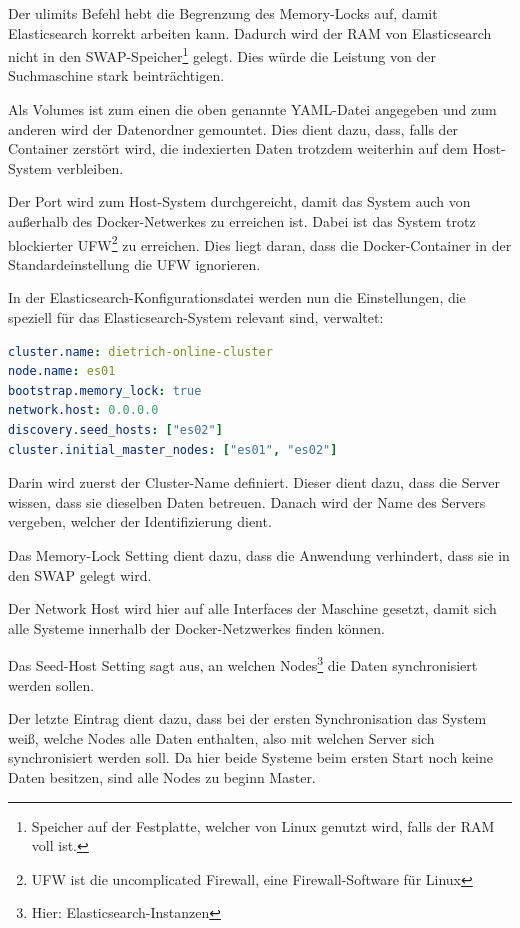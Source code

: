 Der ulimits Befehl hebt die Begrenzung des Memory-Locks auf, damit Elasticsearch korrekt arbeiten kann. Dadurch wird der RAM von Elasticsearch nicht in den SWAP-Speicher\footnote{Speicher auf der Festplatte, welcher von Linux genutzt wird, falls der RAM voll ist.} gelegt. Dies würde die Leistung von der Suchmaschine stark beinträchtigen.

Als Volumes ist zum einen die oben genannte YAML-Datei angegeben und zum anderen wird der Datenordner gemountet. Dies dient dazu, dass, falls der Container zerstört wird, die indexierten Daten trotzdem weiterhin auf dem Host-System verbleiben.

Der Port wird zum Host-System durchgereicht, damit das System auch von außerhalb des Docker-Netwerkes zu erreichen ist. Dabei ist das System trotz blockierter UFW\footnote{UFW ist die uncomplicated Firewall, eine Firewall-Software für Linux} zu erreichen. Dies liegt daran, dass die Docker-Container in der Standardeinstellung die UFW ignorieren.

In der Elasticsearch-Konfigurationsdatei werden nun die Einstellungen, die speziell für das Elasticsearch-System relevant sind, verwaltet: 

\begin{lstlisting}[language=YAML, frame=single, label={lst:es01-yml}, caption=Auschnitt aus der Konfigurationsdatei von Elasticsearch,captionpos=b] 
cluster.name: dietrich-online-cluster
node.name: es01
bootstrap.memory_lock: true
network.host: 0.0.0.0
discovery.seed_hosts: ["es02"]
cluster.initial_master_nodes: ["es01", "es02"]
\end{lstlisting}

Darin wird zuerst der Cluster-Name definiert. Dieser dient dazu, dass die Server wissen, dass sie dieselben Daten betreuen. 
Danach wird der Name des Servers vergeben, welcher der Identifizierung dient.

Das Memory-Lock Setting dient dazu, dass die Anwendung verhindert, dass sie in den SWAP gelegt wird.

Der Network Host wird hier auf alle Interfaces der Maschine gesetzt, damit sich alle Systeme innerhalb der Docker-Netzwerkes finden können.

Das Seed-Host Setting sagt aus, an welchen Nodes\footnote{Hier: Elasticsearch-Instanzen} die Daten synchronisiert werden sollen.

Der letzte Eintrag dient dazu, dass bei der ersten Synchronisation das System weiß, welche Nodes alle Daten enthalten, also mit welchen Server sich synchronisiert werden soll. Da hier beide Systeme beim ersten Start noch keine Daten besitzen, sind alle Nodes zu beginn Master. \cite{ElasticsearchB.V..13.2.2020}


